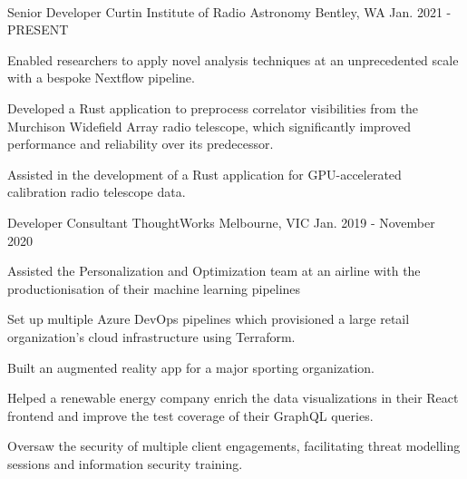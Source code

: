 
 \

\begin{cventries}

    \cventry
    {Senior Developer} %
    {Curtin Institute of Radio Astronomy} %
    {Bentley, WA} %
    {Jan. 2021 - PRESENT} %
    {
        \begin{cvitems} %
        \item {Enabled researchers to apply novel analysis techniques at an unprecedented scale with a bespoke Nextflow pipeline.}
        \item {Developed a Rust application to preprocess correlator visibilities from the Murchison Widefield Array radio telescope, which significantly improved performance and reliability over its predecessor.}
        \item {Assisted in the development of a Rust application for GPU-accelerated calibration radio telescope data.}
        \end{cvitems}
    }

    \cventry
    {Developer Consultant} %
    {ThoughtWorks} %
    {Melbourne, VIC} %
    {Jan. 2019 - November 2020} %
    {
        \begin{cvitems} %
        \item {Assisted the Personalization and Optimization team at an airline with the productionisation of their machine learning pipelines}
        \item {Set up multiple Azure DevOps pipelines which provisioned a large retail organization's cloud infrastructure using Terraform.}
        \item {Built an augmented reality app for a major sporting organization.}
        \item {Helped a renewable energy company enrich the data visualizations in their React frontend and improve the test coverage of their GraphQL queries.}
        \item {Oversaw the security of multiple client engagements, facilitating threat modelling sessions and information security training.}
        \end{cvitems}
    }


\end{cventries}
